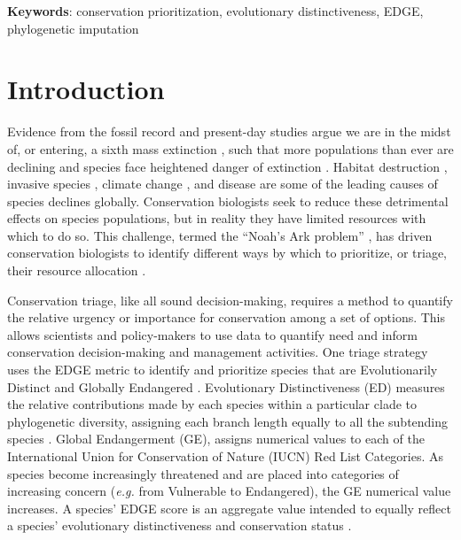 \documentclass[10pt,english]{article}
\begin{document}
\textbf{Keywords}: conservation prioritization, evolutionary distinctiveness, 
EDGE, phylogenetic imputation

\clearpage
\section*{Introduction}

Evidence from the fossil record and present-day studies argue we are in the
midst of, or entering, a sixth mass extinction \autocite{Barnosky2011,
Ceballos2015}, such that more populations than ever are declining and species
face heightened danger of extinction \autocite{Wake2008, Thomas2004}. Habitat
destruction \autocite{Brooks2002}, invasive species \autocite{Molnar2008},
climate change \autocite{Pounds2006}, and disease \autocite{Lips2006} are some
of the leading causes of species declines globally. Conservation biologists seek
to reduce these detrimental effects on species populations, but in reality they
have limited resources with which to do so. This challenge, termed the “Noah's
Ark problem” \autocite{Weitzman1998}, has driven conservation biologists to
identify different ways by which to prioritize, or triage, their resource
allocation \autocite{Bottrill2008}.

Conservation triage, like all sound decision-making, requires a method to
quantify the relative urgency or importance for conservation among a set of
options. This allows scientists and policy-makers to use data to quantify need
and inform conservation decision-making and management activities. One triage
strategy uses the EDGE metric to identify and prioritize species that are
Evolutionarily Distinct and Globally Endangered \autocite{Isaac2007}.
Evolutionary Distinctiveness (ED) measures the relative contributions made by
each species within a particular clade to phylogenetic diversity, assigning each
branch length equally to all the subtending species \autocite{Redding2003,
Isaac2007}. Global Endangerment (GE), assigns numerical values to each of the
International Union for Conservation of Nature (IUCN) Red List Categories. As
species become increasingly threatened and are placed into categories of
increasing concern (\emph{e.g.} from Vulnerable to Endangered), the GE numerical
value increases. A species’ EDGE score is an aggregate value intended to equally
reflect a species’ evolutionary distinctiveness and conservation status
\autocite[even if it does not always in practice; see][]{Pearse2015}.
\end{document}
